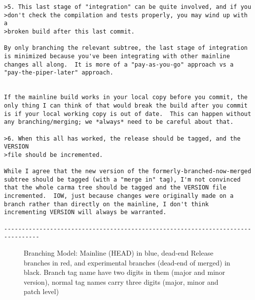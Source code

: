 \documentclass{article}
\begin{document}
\begin{enumerate}
\begin{verbatim}
>5. This last stage of "integration" can be quite involved, and if you
>don't check the compilation and tests properly, you may wind up with a
>broken build after this last commit.

By only branching the relevant subtree, the last stage of integration
is minimized because you've been integrating with other mainline
changes all along.  It is more of a "pay-as-you-go" approach vs a
"pay-the-piper-later" approach.
                                                                       
                                                                                
If the mainline build works in your local copy before you commit, the
only thing I can think of that would break the build after you commit
is if your local working copy is out of date.  This can happen without
any branching/merging; we *always* need to be careful about that.

>6. When this all has worked, the release should be tagged, and the VERSION
>file should be incremented.

While I agree that the new version of the formerly-branched-now-merged
subtree should be tagged (with a "merge in" tag), I'm not convinced
that the whole carma tree should be tagged and the VERSION file
incremented.  IOW, just because changes were originally made on a
branch rather than directly on the mainline, I don't think
incrementing VERSION will always be warranted.

--------------------------------------------------------------------------------
\end{verbatim}
\normalsize




\end{enumerate}

\begin{figure}[htb!]
\caption{Branching Model: Mainline (HEAD) in blue, dead-end Release branches in red,
and experimental branches (dead-end of merged) in black. Branch tag name have two
digits in them (major and minor version), normal tag names carry three digits
(major, minor and  patch level)}
\label{f:branching}
\end{figure}
\end{document}
